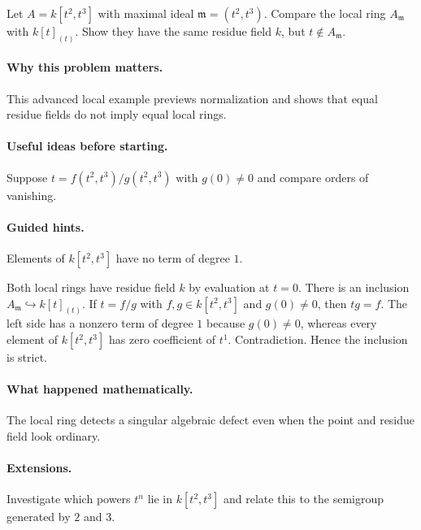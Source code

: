 \begin{problem}
Let $A=k[t^2,t^3]$ with maximal ideal $\mathfrak m=(t^2,t^3)$.  Compare the local ring $A_{\mathfrak m}$ with $k[t]_{(t)}$.  Show they have the same residue field $k$, but $t\notin A_{\mathfrak m}$.
\end{problem}

\paragraph{Why this problem matters.}
This advanced local example previews normalization and shows that equal residue fields do not imply equal local rings.

\paragraph{Useful ideas before starting.}
Suppose $t=f(t^2,t^3)/g(t^2,t^3)$ with $g(0)\neq0$ and compare orders of vanishing.

\paragraph{Guided hints.}
Elements of $k[t^2,t^3]$ have no term of degree $1$.

\begin{solution}
Both local rings have residue field $k$ by evaluation at $t=0$.  There is an inclusion $A_{\mathfrak m}\hookrightarrow k[t]_{(t)}$.  If $t=f/g$ with $f,g\in k[t^2,t^3]$ and $g(0)\neq0$, then $tg=f$.  The left side has a nonzero term of degree $1$ because $g(0)\neq0$, whereas every element of $k[t^2,t^3]$ has zero coefficient of $t^1$.  Contradiction.  Hence the inclusion is strict.
\end{solution}

\paragraph{What happened mathematically.}
The local ring detects a singular algebraic defect even when the point and residue field look ordinary.

\paragraph{Extensions.}
Investigate which powers $t^n$ lie in $k[t^2,t^3]$ and relate this to the semigroup generated by $2$ and $3$.
